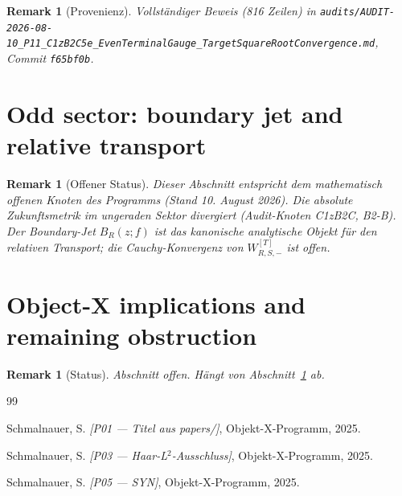 \documentclass[12pt,a4paper]{amsart}
\newtheorem{remark}[theorem]{Remark}
\newcommand{\BR}{B_R}
\begin{document}
\begin{remark}[Provenienz]
  Vollständiger Beweis (816 Zeilen) in
  \texttt{audits/AUDIT-2026-08-10\_P11\_C1zB2C5e\_EvenTerminalGauge\_TargetSquareRootConvergence.md},
  Commit \texttt{f65bf0b}.
\end{remark}

\section{Odd sector: boundary jet and relative transport}
\label{sec:odd-open}


\begin{remark}[Offener Status]
  Dieser Abschnitt entspricht dem mathematisch offenen Knoten
  des Programms (Stand 10. August 2026). Die absolute
  Zukunftsmetrik im ungeraden Sektor divergiert (Audit-Knoten
  C1zB2C, B2-B). Der Boundary-Jet $\BR(z; f)$ ist das
  kanonische analytische Objekt für den relativen Transport;
  die Cauchy-Konvergenz von $W_{R,S,-}^{[T]}$ ist offen.
\end{remark}

\section{Object-X implications and remaining obstruction}
\label{sec:obstruction}


\begin{remark}[Status]
  Abschnitt offen. Hängt von Abschnitt~\ref{sec:odd-open} ab.
\end{remark}


\begin{thebibliography}{99}

 Schmalnauer, S. \textit{[P01 — Titel aus papers/]},
  Objekt-X-Programm, 2025.

 Schmalnauer, S. \textit{[P03 — Haar-L$^2$-Ausschluss]},
  Objekt-X-Programm, 2025.

 Schmalnauer, S. \textit{[P05 — SYN]},
  Objekt-X-Programm, 2025.


\end{thebibliography}
\end{document}
